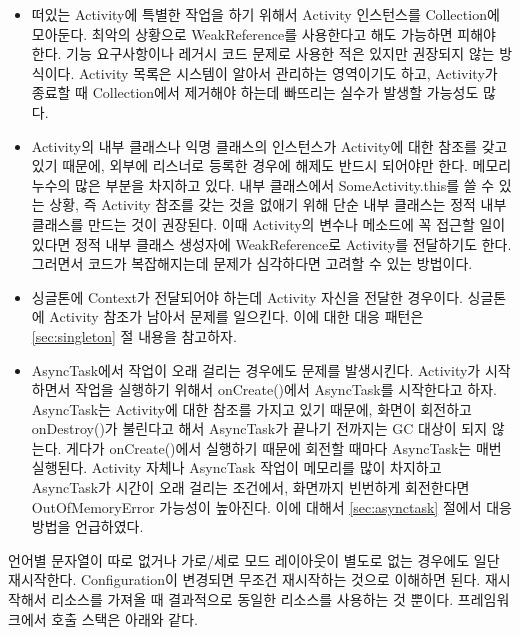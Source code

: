 \begin{itemize}
\item 떠있는 Activity에 특별한 작업을 하기 위해서 Activity 인스턴스를 Collection에 모아둔다. 최악의 상황으로 WeakReference를 사용한다고 해도 가능하면 피해야 한다. 기능 요구사항이나 레거시 코드 문제로 사용한 적은 있지만 권장되지 않는 방식이다. Activity 목록은 시스템이 알아서 관리하는 영역이기도 하고, Activity가 종료할 때 Collection에서 제거해야 하는데 빠뜨리는 실수가 발생할 가능성도 많다.
\item Activity의 내부 클래스나 익명 클래스의 인스턴스가 Activity에 대한 참조를 갖고 있기 때문에, 외부에 리스너로 등록한 경우에 해제도 반드시 되어야만 한다. 메모리 누수의 많은 부분을 차지하고 있다. 내부 클래스에서 SomeActivity.this를 쓸 수 있는 상황, 즉 Activity 참조를 갖는 것을 없애기 위해 단순 내부 클래스는 정적 내부 클래스를 만드는 것이 권장된다.
이때 Activity의 변수나 메소드에 꼭 접근할 일이 있다면 정적 내부 클래스 생성자에 WeakReference로 Activity를 전달하기도 한다. 
그러면서 코드가 복잡해지는데 문제가 심각하다면 고려할 수 있는 방법이다. 
\item 싱글톤에 Context가 전달되어야 하는데 Activity 자신을 전달한 경우이다. 싱글톤에 Activity 참조가 남아서 문제를 일으킨다. 이에 대한 대응 패턴은 \ref{sec:singleton} 절 내용을 참고하자.
\item AsyncTask에서 작업이 오래 걸리는 경우에도 문제를 발생시킨다. Activity가 시작하면서 작업을 실행하기 위해서 onCreate()에서 AsyncTask를 시작한다고 하자. AsyncTask는 Activity에 대한 참조를 가지고 있기 때문에, 화면이 회전하고 onDestroy()가 불린다고 해서 AsyncTask가 끝나기 전까지는 GC 대상이 되지 않는다. 게다가 onCreate()에서 실행하기 때문에 회전할 때마다 AsyncTask는 매번 실행된다. Activity 자체나 AsyncTask 작업이 메모리를 많이 차지하고 AsyncTask가 시간이 오래 걸리는 조건에서, 화면까지 빈번하게 회전한다면 OutOfMemoryError 가능성이 높아진다. 이에 대해서 \ref{sec:asynctask} 절에서 대응 방법을 언급하였다.
\end{itemize}

언어별 문자열이 따로 없거나 가로/세로 모드 레이아웃이 별도로 없는 경우에도 일단 재시작한다. Configuration이 변경되면 무조건 재시작하는 것으로 이해하면 된다. 재시작해서 리소스를 가져올 때 결과적으로 동일한 리소스를 사용하는 것 뿐이다. 프레임워크에서 호출 스택은 아래와 같다.

